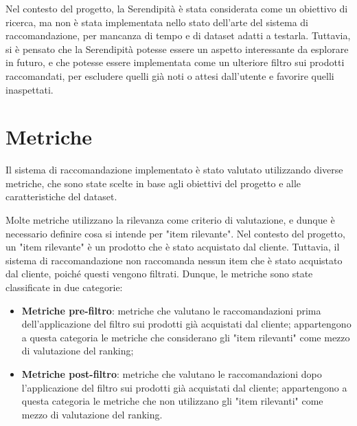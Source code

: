 Nel contesto del progetto, la Serendipità è stata considerata come un obiettivo di ricerca, ma non è stata implementata nello stato dell'arte del sistema di raccomandazione, per mancanza di tempo e di dataset adatti a testarla. Tuttavia, si è pensato che la Serendipità potesse essere un aspetto interessante da esplorare in futuro, e che potesse essere implementata come un ulteriore filtro sui prodotti raccomandati, per escludere quelli già noti o attesi dall'utente e favorire quelli inaspettati.


\section{Metriche}

Il sistema di raccomandazione implementato è stato valutato utilizzando diverse metriche, che sono state scelte in base agli obiettivi del progetto e alle caratteristiche del dataset.

Molte metriche utilizzano la rilevanza come criterio di valutazione, e dunque è necessario definire cosa si intende per "item rilevante". Nel contesto del progetto, un "item rilevante" è un prodotto che è stato acquistato dal cliente. Tuttavia, il sistema di raccomandazione non raccomanda nessun item che è stato acquistato dal cliente, poiché questi vengono filtrati. Dunque, le metriche sono state classificate in due categorie:
\begin{itemize}
    \item \textbf{Metriche pre-filtro}: metriche che valutano le raccomandazioni prima dell'applicazione del filtro sui prodotti già acquistati dal cliente; appartengono a questa categoria le metriche che considerano gli "item rilevanti" come mezzo di valutazione del ranking;
    \item \textbf{Metriche post-filtro}: metriche che valutano le raccomandazioni dopo l'applicazione del filtro sui prodotti già acquistati dal cliente; appartengono a questa categoria le metriche che non utilizzano gli "item rilevanti" come mezzo di valutazione del ranking.
\end{itemize}

